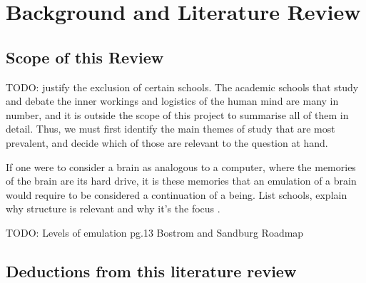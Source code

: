 \chapter{Background and Literature Review}

\section{Scope of this Review}
TODO: justify the exclusion of certain schools. 
The academic schools that study and debate the inner workings and logistics of
the human mind are many in number, and it is outside the scope of this project
to summarise all of them in detail. Thus, we must first identify the main themes
of study that are most prevalent, and decide which of those are relevant to
the question at hand. 

If one were to consider a brain as analogous to a computer, where the memories
of the brain are its hard drive, it is these memories that an emulation of a
brain would require to be considered a continuation of a being. List schools,
explain why structure is relevant and why it's the focus
\autocite{eichenbaum_cognitive_2011}.

TODO: Levels of emulation pg.13 Bostrom and Sandburg Roadmap






\section{Deductions from this literature review}

